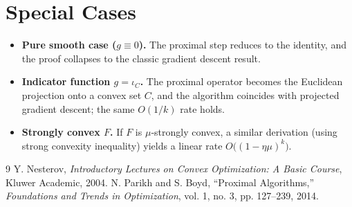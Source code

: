 \documentclass{article}
\begin{document}
\section*{Special Cases}
\begin{itemize}
    \item \textbf{Pure smooth case ($g\equiv0$).} The proximal step reduces to the identity, and the proof collapses to the classic gradient descent result.
    \item \textbf{Indicator function $g=\iota_{C}$.} The proximal operator becomes the Euclidean projection onto a convex set $C$, and the algorithm coincides with projected gradient descent; the same $O(1/k)$ rate holds.
    \item \textbf{Strongly convex $F$.} If $F$ is $\mu$‑strongly convex, a similar derivation (using strong convexity inequality) yields a linear rate $O\!\bigl((1-\eta\mu)^{k}\bigr)$.
\end{itemize}

\begin{thebibliography}{9}
 Y. Nesterov, \emph{Introductory Lectures on Convex Optimization: A Basic Course}, Kluwer Academic, 2004.
 N. Parikh and S. Boyd, ``Proximal Algorithms,'' \emph{Foundations and Trends in Optimization}, vol. 1, no. 3, pp. 127–239, 2014.
\end{thebibliography}
\end{document}
